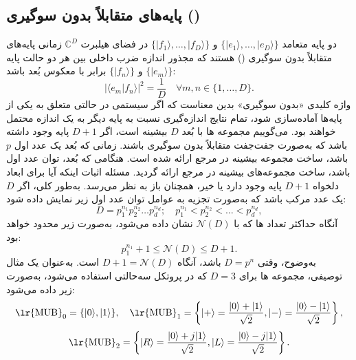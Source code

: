 \subsection{پایه‌های متقابلاً بدون سوگیری ()}
\label{subsec:8-4-1}
دو پایه متعامد $\{|e_1\rangle, \dots, |e_D\rangle\}$ و $\{|f_1\rangle, \dots, |f_D\rangle\}$ در فضای هیلبرت $\mathbb{C}^D$ زمانی پایه‌های متقابلاً بدون سوگیری () هستند که مجذور اندازه ضرب داخلی بین هر دو حالت پایه $\{|e_m\rangle\}$ و $\{|f_n\rangle\}$ برابر با معکوس بُعد باشد:
\begin{equation}
	|\langle e_m | f_n \rangle|^2 = \frac{1}{D} \quad \forall m, n \in \{1, \dots, D\}.
	\label{eq:8-57}
\end{equation}
واژه کلیدی «بدون سوگیری» بدین معناست که اگر سیستمی در حالتی متعلق به یکی از پایه‌ها آماده‌سازی شود، تمام نتایج اندازه‌گیری نسبت به پایه دیگر به یک اندازه محتمل خواهند بود. می‌گوییم مجموعه ها با بُعد $D$ بیشینه است، اگر $D+1$ پایه وجود داشته باشد که به‌صورت جفت‌جفت متقابلاً بدون سوگیری باشند. زمانی که بُعد یک عدد اول $p$ باشد، ساخت مجموعه بیشینه در مرجع \cite{8-76} ارائه شده است. هنگامی که بُعد، توان عدد اول باشد، ساخت مجموعه‌های بیشینه در مرجع \cite{8-77} ارائه گردید. مسئله اثبات اینکه آیا برای ابعاد دلخواه $D+1$ پایه وجود دارد یا خیر، همچنان باز به نظر می‌رسد. به‌طور کلی، اگر $D$ یک عدد مرکب باشد که به‌صورت تجزیه به عوامل توان عدد اول زیر نمایش داده شود:
\begin{equation}
	D = p_1^{n_1} p_2^{n_2} \dots p_d^{n_d}; \quad p_1^{n_1} < p_2^{n_2} < \dots < p_d^{n_d},
	\label{eq:8-58}
\end{equation}
آنگاه حداکثر تعداد ها که با $\mathcal{N}(D)$ نشان داده می‌شود، به‌صورت زیر محدود خواهد بود:
\begin{equation}
	p_1^{n_1} + 1 \leq \mathcal{N}(D) \leq D + 1.
	\label{eq:8-59}
\end{equation}
به‌وضوح، وقتی $D = p^n$ باشد، آنگاه $D + 1 = \mathcal{N}(D)$ است.
به‌عنوان یک مثال توصیفی، مجموعه ها برای $D=3$ که در پروتکل   سه‌حالتی استفاده می‌شود، به‌صورت زیر داده می‌شود:
\begin{equation}
	\text{\lr{MUB}}_0 = \{ |0\rangle, |1\rangle \}, \quad \text{\lr{MUB}}_1 = \left\{ |+\rangle = \frac{|0\rangle + |1\rangle}{\sqrt{2}}, |-\rangle = \frac{|0\rangle - |1\rangle}{\sqrt{2}} \right\},
	\label{eq:8-60}
\end{equation}
\begin{equation}
	\text{\lr{MUB}}_2 = \left\{ |R\rangle = \frac{|0\rangle + j|1\rangle}{\sqrt{2}}, |L\rangle = \frac{|0\rangle - j|1\rangle}{\sqrt{2}} \right\}.
	\label{eq:8-61}
\end{equation}

